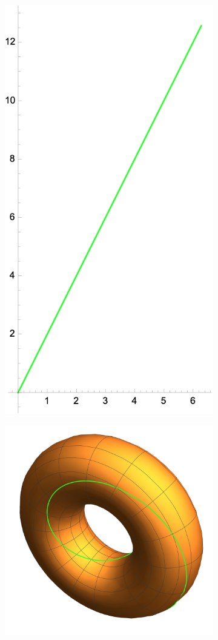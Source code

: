 \documentclass[spanish]{book}
\theoremstyle{definition}
\begin{document}
\begin{figure}[H]
	\begin{subfigure}{0.5\textwidth}
		\centering
		\includegraphics[width=0.5\linewidth]{sup3}
	\end{subfigure}
	\begin{subfigure}{0.5\textwidth}
		\centering
		\includegraphics[width=0.7\linewidth]{sup4}
	\end{subfigure}
\end{figure}
\end{document}
